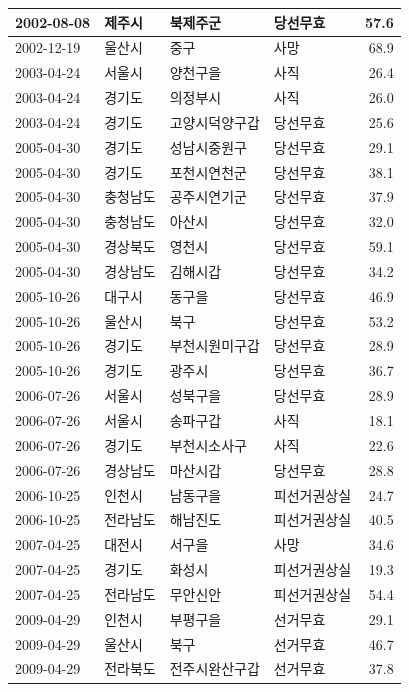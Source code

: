 \documentclass[
  11pt,
  letter]{article}
\begin{document}
\begin{longtable}[t]{l|l|l|l|r}
\hline
2002-08-08 & 제주시 & 북제주군 & 당선무효 & 57.6\\
\hline
2002-12-19 & 울산시 & 중구 & 사망 & 68.9\\
\hline
2003-04-24 & 서울시 & 양천구을 & 사직 & 26.4\\
\hline
2003-04-24 & 경기도 & 의정부시 & 사직 & 26.0\\
\hline
2003-04-24 & 경기도 & 고양시덕양구갑 & 당선무효 & 25.6\\
\hline
2005-04-30 & 경기도 & 성남시중원구 & 당선무효 & 29.1\\
\hline
2005-04-30 & 경기도 & 포천시연천군 & 당선무효 & 38.1\\
\hline
2005-04-30 & 충청남도 & 공주시연기군 & 당선무효 & 37.9\\
\hline
2005-04-30 & 충청남도 & 아산시 & 당선무효 & 32.0\\
\hline
2005-04-30 & 경상북도 & 영천시 & 당선무효 & 59.1\\
\hline
2005-04-30 & 경상남도 & 김해시갑 & 당선무효 & 34.2\\
\hline
2005-10-26 & 대구시 & 동구을 & 당선무효 & 46.9\\
\hline
2005-10-26 & 울산시 & 북구 & 당선무효 & 53.2\\
\hline
2005-10-26 & 경기도 & 부천시원미구갑 & 당선무효 & 28.9\\
\hline
2005-10-26 & 경기도 & 광주시 & 당선무효 & 36.7\\
\hline
2006-07-26 & 서울시 & 성북구을 & 당선무효 & 28.9\\
\hline
2006-07-26 & 서울시 & 송파구갑 & 사직 & 18.1\\
\hline
2006-07-26 & 경기도 & 부천시소사구 & 사직 & 22.6\\
\hline
2006-07-26 & 경상남도 & 마산시갑 & 당선무효 & 28.8\\
\hline
2006-10-25 & 인천시 & 남동구을 & 피선거권상실 & 24.7\\
\hline
2006-10-25 & 전라남도 & 해남진도 & 피선거권상실 & 40.5\\
\hline
2007-04-25 & 대전시 & 서구을 & 사망 & 34.6\\
\hline
2007-04-25 & 경기도 & 화성시 & 피선거권상실 & 19.3\\
\hline
2007-04-25 & 전라남도 & 무안신안 & 피선거권상실 & 54.4\\
\hline
2009-04-29 & 인천시 & 부평구을 & 선거무효 & 29.1\\
\hline
2009-04-29 & 울산시 & 북구 & 선거무효 & 46.7\\
\hline
2009-04-29 & 전라북도 & 전주시완산구갑 & 선거무효 & 37.8\\

\end{longtable}
\end{document}
